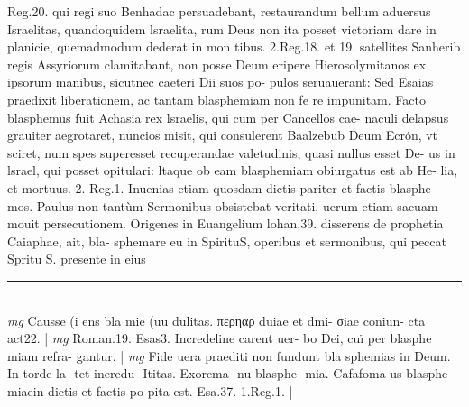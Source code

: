 \documentclass{article}
\begin{document}
\begin{pages}
Reg.20. qui regi suo Benhadac persuadebant, restaurandum bellum aduersus Israelitas, quandoquidem lsraelita, rum Deus non ita posset victoriam dare in planicie, quemadmodum dederat in mon tibus. 2.Reg.18. et 19. satellites Sanherib regis Assyriorum clamitabant, non posse Deum eripere Hierosolymitanos ex ipsorum manibus, sicutnec caeteri Dii suos po- pulos seruauerant: Sed Esaias praedixit liberationem, ac tantam blasphemiam non fe re impunitam. Facto blasphemus fuit Achasia rex lsraelis, qui cum per Cancellos cae- naculi delapsus grauiter aegrotaret, nuncios misit, qui consulerent Baalzebub Deum Ecrón, vt sciret, num spes superesset recuperandae valetudinis, quasi nullus esset De- us in lsrael, qui posset opitulari: ltaque ob eam blasphemiam obiurgatus est ab He- lia, et mortuus. 2. Reg.1. Inuenias etiam quosdam dictis pariter et factis blasphe- mos. Paulus non tantùm Sermonibus obsistebat veritati, uerum etiam saeuam mouit persecutionem. Origenes in Euangelium lohan.39. disserens de prophetia Caiaphae, ait, bla- sphemare eu in SpirituS, operibus et sermonibus, qui peccat Spritu S. presente in eius  \pend
\vspace{0.5cm}\noindent
\vspace{0.2cm}\rule{1cm}{0.2pt}\\ 
\hspace{0.2cm}\textit{mg}
\footnotesize Causse (i ens bla mie (uu dulitas. περηαρ duiae et dmi- σiae coniun- cta act22. 
\normalsize| 
\hspace{0.2cm}\textit{mg}
\footnotesize Roman.19. Esas3. Incredeline carent uer- bo Dei, cuï per blasphe miam refra- gantur. 
\normalsize| 
\hspace{0.2cm}\textit{mg}
\footnotesize Fide uera praediti non fundunt bla sphemias in Deum. In torde la- tet ineredu- Ititas. Exorema- nu blasphe- mia. Cafafoma us blasphe- miaein dictis et factis po pita est. Esa.37. 1.Reg.1. 
\normalsize| 

\end{pages}
\end{document}
